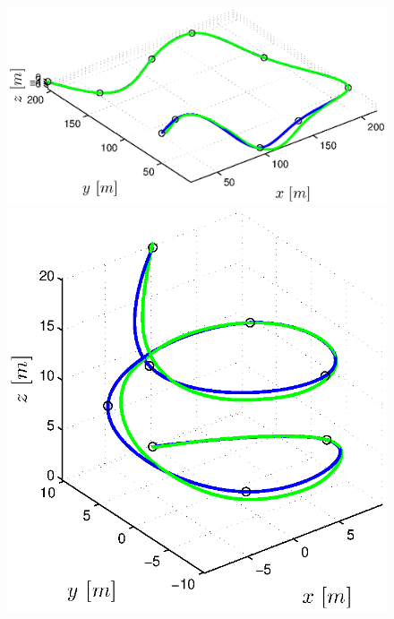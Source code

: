 \begin{figure}[h]
  \begin{minipage}[t]{0.32\textwidth}
    \includegraphics[width = \textwidth]{trackings/figure_3D_road_SplineDegree3_trajectoryFollowing_Disturbance_1}
  \end{minipage}
  \hfill
  \begin{minipage}[t]{0.32\textwidth}
    \includegraphics[width = \textwidth]{trackings/figure_3D_helix_SplineDegree3_trajectoryFollowing_Disturbance_1}
  \end{minipage}
  \hfill
  \begin{minipage}[t]{0.32\textwidth}

\end{minipage}
\end{figure}
